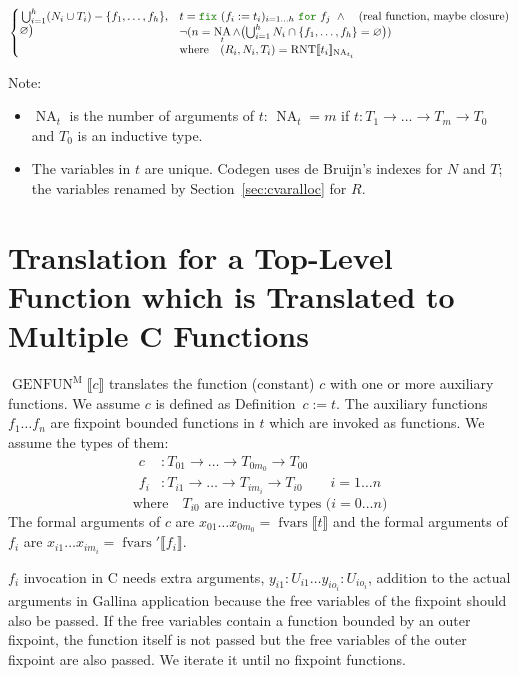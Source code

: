 \documentclass[a4paper,fleqn]{article}
\def\gallina{\textrm{Gallina}}
\def\codegen{\textrm{Codegen}}
\newcommand{\kwDefinition}{\mbox{\color{myviolet}\ttfamily Definition}}
\newcommand{\kwfix}{\mbox{\color{mygreen}\ttfamily fix}}
\newcommand{\kwfor}{\mbox{\color{mygreen}\ttfamily for}}
\newcommand{\fix}[4]{\kwfix~(#1 := #2)_{#3}~\kwfor~#4}
\DeclareMathOperator{\NA}{NA}
\newcommand{\BRA}[1]{\llbracket #1 \rrbracket}
\DeclareMathOperator{\genfunop}{GENFUN}
\newcommand{\genfunm}[1]{\genfunop^\mathrm{M}\BRA{#1}}
\DeclareMathOperator{\RNTop}{RNT}
\newcommand{\RNT}[2]{\RNTop\BRA{#1}_{#2}}
\newcommand{\secref}[1]{Section~\ref{#1}}
\DeclareMathOperator{\fvarsop}{fvars}
\newcommand{\fvars}[1]{\fvarsop\BRA{#1}}
\newcommand{\fvarsd}[1]{\fvarsop'\BRA{#1}}
\begin{document}
\begin{align*}
\begin{cases}
\begin{aligned}[t]
             & \textstyle\bigcup_{i=1}^h (N_i \cup T_i) - \{f_1,\dots, f_h\}, \\
             & \varnothing \bigr)
    \end{aligned} &
      \begin{aligned}[t]
        & t = \fix{f_i}{t_i}{i=1\dots h}{f_j} ~\wedge \quad \text{(real function, maybe closure)} \\
        & \neg (n = \NA_t \wedge \bigl(\textstyle\bigcup_{i=1}^h N_i \cap \{f_1,\dots, f_h\} = \varnothing\bigr)) \\
        & \text{where}\quad (R_i, N_i, T_i) = \RNT{t_i}{\NA_{t_i}}
      \end{aligned}
  \end{cases}
\end{align*}
{\small Note:
\begin{itemize}
  \item $\NA_t$ is the number of arguments of $t$: \quad $\NA_t=m$ if $t : T_1 \rightarrow \dots \rightarrow T_m \rightarrow T_0$ and $T_0$ is an inductive type.
  \item The variables in $t$ are unique.
    \codegen{} uses de Bruijn's indexes for $N$ and $T$;
    the variables renamed by \secref{sec:cvaralloc} for $R$.
\end{itemize}}

\section{Translation for a Top-Level Function which is Translated to Multiple C Functions}\label{sec:genfunm}
\raggedright
$\genfunm{c}$ translates the function (constant) $c$ with one or more auxiliary functions.
We assume $c$ is defined as \kwDefinition~$c := t.$
The auxiliary functions $f_1 \dots f_n$ are fixpoint bounded functions in $t$ which are invoked as functions.
We assume the types of them:
\begin{align*}
  c &: T_{01} \rightarrow \dots \rightarrow T_{0m_0} \rightarrow T_{00} \\
  f_i &: T_{i1} \rightarrow \dots \rightarrow T_{im_i} \rightarrow T_{i0} && i = 1\dots n
\end{align*}
\[ \text{where} \quad \text{$T_{i0}$ are inductive types ($i=0\dots n$)} \]
The formal arguments of $c$ are $x_{01}\dots x_{0m_0} = \fvars{t}$ and
the formal arguments of $f_i$ are $x_{i1}\dots x_{im_i} = \fvarsd{f_i}$.

$f_i$ invocation in C needs extra arguments, $y_{i1}:U_{i1} \dots y_{io_i}:U_{io_i}$, addition to the actual arguments in \gallina{} application because the free variables of the fixpoint should also be passed.
If the free variables contain a function bounded by an outer fixpoint, the function itself is not passed but the free variables of the outer fixpoint are also passed.
We iterate it until no fixpoint functions.
\end{document}
